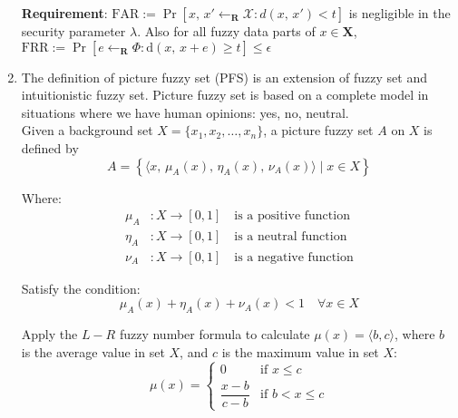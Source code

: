 \documentclass[graybox]{svmult}
\begin{document}
\begin{enumerate}[label=(\roman*), itemsep=1em]
          \textbf{Requirement}: \( \text{FAR} := \Pr[x,\, x' \leftarrow_{\mathbf{R}} {\mathcal{X}} : d(x,\, x') < t] \) is negligible in the security parameter  \( \lambda \). Also for all fuzzy data parts of \( x \in \mathbf{X} \), \( \text{FRR} := \Pr[e \leftarrow_{\mathbf{R}} \varPhi : \mathrm{d}(x, \, x + e) \geq t] \leq \epsilon \)
    \item The definition of picture fuzzy set (PFS) is an extension of fuzzy set and intuitionistic fuzzy set. Picture fuzzy set is based on a complete model in situations where we have human opinions: yes, no, neutral. \\[6pt]
          Given a background set \( X = \{x_1, x_2, \dots, x_n \} \), a picture fuzzy set \( A \) on \( X \) is defined by
          \begin{equation}
              A = \left\{ \langle x,\, \mu_A(x),\, \eta_A(x),\, \nu_A(x) \rangle \mid x \in X \right\}
          \end{equation}

          Where:
          \begin{align}
              \mu_A  & : X \to [0, 1] \quad \text{is a positive function} \\[6pt]
              \eta_A & : X \to [0, 1] \quad \text{is a neutral function}  \\[6pt]
              \nu_A  & : X \to [0, 1] \quad \text{is a negative function}
          \end{align}

          Satisfy the condition:
          \begin{equation}
              \mu_A(x) + \eta_A(x) + \nu_A(x) < 1 \quad \forall x \in X
          \end{equation}

          Apply the \( L- R \) fuzzy number formula to calculate \( \mu(x) = \langle b, c \rangle \), where \( b \) is the average value in set \( X \), and \( c \) is the maximum value in set \( X \):
          \begin{equation}
              \mu(x) = \begin{cases}
                  0                & \text{if } x \leq c     \\
                  \dfrac{x-b}{c-b} & \text{if } b < x \leq c
              \end{cases}
          \end{equation}


\end{enumerate}
\end{document}
